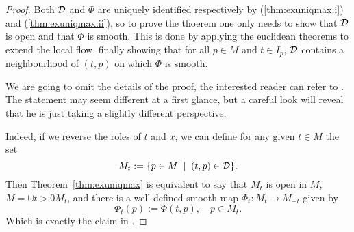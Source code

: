 \begin{proof}
  Both $\mathcal{D}$ and $\Phi$ are uniquely identified respectively by (\ref{thm:exuniqmax:i}) and (\ref{thm:exuniqmax:ii}), so to prove the thoerem one only needs to show that $\mathcal{D}$ is open and that $\Phi$ is smooth.
  This is done by applying the euclidean theorems to extend the local flow, finally showing that for all $p\in M$ and $t\in I_p$, $\mathcal{D}$ contains a neighbourhood of $(t,p)$ on which $\Phi$ is smooth.

  We are going to omit the details of the proof, the interested reader can refer to \cite[Proposition 9.12]{book:lee}.
  The statement may seem different at a first glance, but a careful look will reveal that he is just taking a slightly different perspective.

  Indeed, if we reverse the roles of $t$ and $x$, we can define for any given $t\in M$ the set
  \begin{equation}
    M_t := \{p\in M \;\mid\; (t,p)\in\mathcal{D}\}.
  \end{equation}
  Then Theorem~\ref{thm:exuniqmax} is equivalent to say that $M_t$ is open in $M$, $M = \cup{t>0} M_t$, and there is a well-defined smooth map $\Phi_t : M_t \to M_{-t}$ given by
  \begin{equation}\label{eq:flowdiffeo}
    \Phi_t(p) := \Phi(t,p), \quad p\in M_t.
  \end{equation}
  Which is exactly the claim in \cite[Proposition 9.12]{book:lee}.





\end{proof}
